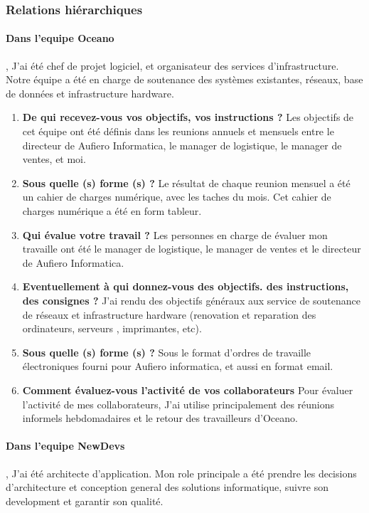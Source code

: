 \documentclass{resume} %
\begin{document}
	\subsubsection{Relations hiérarchiques} 
	

		\paragraph{Dans l'equipe Oceano}, 	J'ai été chef de projet logiciel, et organisateur des services d'infrastructure.  Notre équipe a été en charge de soutenance des systèmes existantes, réseaux, base de données et infrastructure hardware. 
		
		\begin{enumerate}
		\item \textbf{De qui recevez-vous vos objectifs, vos instructions ?}
			Les objectifs de cet équipe ont été définis dans les reunions annuels et mensuels entre le directeur de Aufiero Informatica, le manager de logistique, le manager de ventes, et moi.
		\item \textbf{Sous quelle (s) forme (s) ?}
			Le résultat de chaque reunion mensuel a été un cahier de charges numérique, avec les taches du mois. Cet cahier de charges numérique  a été en form tableur.
		\item \textbf{Qui évalue votre travail ?}
			Les personnes en charge de évaluer mon travaille ont été  le manager de logistique, le manager de ventes et le directeur de Aufiero Informatica. 
		\item  \textbf{Eventuellement à qui donnez-vous des objectifs. des instructions, des consignes ?}
			J'ai rendu des objectifs généraux aux service de soutenance de réseaux et infrastructure hardware (renovation et reparation des ordinateurs, serveurs , imprimantes, etc).
		\item \textbf{Sous quelle (s) forme (s) ?}
			Sous le format d'ordres de travaille électroniques fourni pour Aufiero informatica, et aussi en format email. 
		\item \textbf{Comment évaluez-vous l'activité de vos collaborateurs}
			Pour évaluer l'activité de mes collaborateurs, J'ai utilise principalement des réunions informels hebdomadaires et le retour des travailleurs d'Oceano. 
		\end{enumerate}
		
		\paragraph{Dans l'equipe NewDevs}, J'ai été architecte d'application. Mon role principale a été prendre les decisions d'architecture et conception general des solutions informatique, suivre son development et garantir son qualité. 
		
\end{document}
